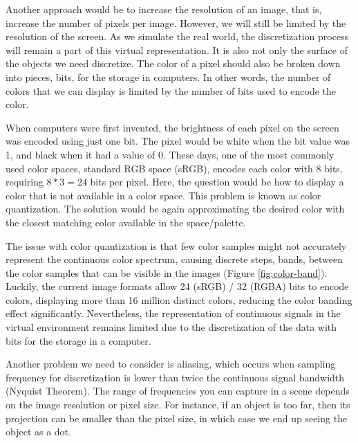 Another approach would be to increase the resolution of an image, that is, increase the number of pixels per image. However, we will still be limited by the resolution of the screen. As we simulate the real world, the discretization process will remain a part of this virtual representation. It is also not only the surface of the objects we need discretize. The color of a pixel should also be broken down into pieces, bits, for the storage in computers. In other words, the number of colors that we can display is limited by the number of bits used to encode the color. 

When computers were first invented, the brightness of each pixel on the screen was encoded using just one bit. The pixel would be white when the bit value was 1, and black when it had a value of 0. These days, one of the most commonly used color spaces, standard RGB space (sRGB), encodes each color with 8 bits, requiring $8 * 3 = 24$ bits per pixel. Here, the question would be how to display a color that is not available in a color space. This problem is known as color quantization. The solution would be again approximating the desired color with the closest matching color available in the space/palette.




The issue with color quantization is that few color samples might not accurately represent the continuous color spectrum, causing discrete steps, bands, between the color samples that can be visible in the images (Figure \ref{fig:color-band}). Luckily, the current image formats allow 24 (sRGB) / 32 (RGBA) bits to encode colors, displaying more than 16 million distinct colors, reducing the color banding effect significantly. Nevertheless, the representation of continuous signals in the virtual environment remains limited due to the discretization of the data with bits for the storage in a computer.

Another problem we need to consider is aliasing, which occurs when sampling frequency for discretization is lower than twice the continuous signal bandwidth (Nyquist Theorem). The range of frequencies you can capture in a scene depends on the image resolution or pixel size. For instance, if an object is too far, then its projection can be smaller than the pixel size, in which case we end up seeing the object as a dot.



